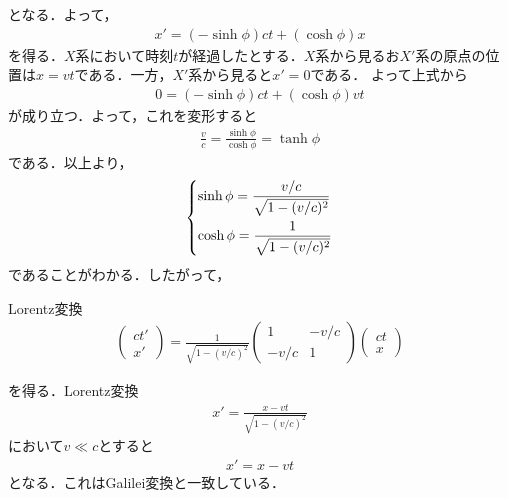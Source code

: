 \documentclass{report}
\begin{document}
  となる．よって，
  \begin{align}
    x' = (-\sinh\phi)ct + (\cosh\phi)x
  \end{align}
  を得る．$X$系において時刻$t$が経過したとする．$X$系から見るお$X'$系の原点の位置は$x=vt$である．一方，$X'$系から見ると$x'=0$である．
  よって上式から
  \begin{align}
    0 = (-\sinh\phi)ct + (\cosh\phi)vt
  \end{align}
  が成り立つ．よって，これを変形すると
  \begin{align}
    \frac{v}{c} = \frac{\sinh\phi}{\cosh\phi} = \tanh\phi
  \end{align}
  である．以上より，
  \begin{align}
    \begin{dcases}
      \sinh\phi = \frac{v/c}{\sqrt{1- (v/c)^2}}\\
      \cosh\phi = \frac{1}{\sqrt{1- (v/c)^2}}
    \end{dcases}
  \end{align}
  であることがわかる．したがって，
  \begin{itembox}[l]{Lorentz変換}
    \begin{align}
      \label{LorentzTransformation}
      \begin{pmatrix}
        ct' \\ x'
      \end{pmatrix}
      =
      \frac{1}{\sqrt{1 - (v/c)^2}}
      \begin{pmatrix}
        1 & -v/c\\
        -v/c & 1
      \end{pmatrix}
      \begin{pmatrix}
        ct\\x
      \end{pmatrix}
    \end{align}
  \end{itembox}
  を得る．Lorentz変換
  \begin{align}
    x' = \frac{x-vt}{\sqrt{1-(v/c)^2}}
  \end{align}
  において$v \ll c$とすると
  \begin{align}
    x' = x - vt
  \end{align}
  となる．これはGalilei変換と一致している．
\end{document}
